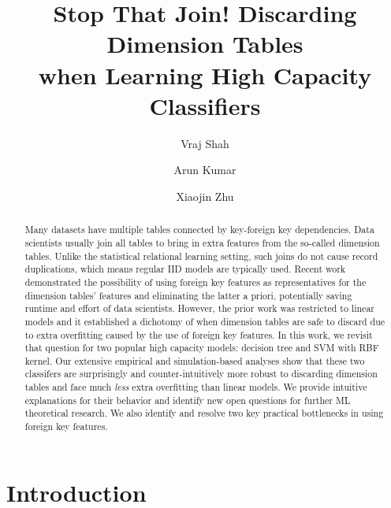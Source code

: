 

\title{Stop That Join! Discarding Dimension Tables \\when Learning High Capacity Classifiers}

\author{Vraj Shah}
\author{Arun Kumar}
\author{Xiaojin Zhu}

\begin{abstract}
Many datasets have multiple tables connected by key-foreign key dependencies.
Data scientists usually join all tables to bring in extra features from the so-called 
dimension tables. Unlike the statistical relational learning setting, such joins do 
not cause record duplications, which means regular IID models are typically used. Recent
work demonstrated the possibility of using foreign key features as representatives for the 
dimension tables' features and eliminating the latter a priori, potentially saving runtime
and effort of data scientists. However, the prior work was restricted to linear models 
and it established a dichotomy of when dimension tables are safe to discard due to extra
overfitting caused by the use of foreign key features. In this work, we revisit that question 
for two popular high capacity models: decision tree and SVM with RBF kernel. Our 
extensive empirical and simulation-based analyses show that these two classifers are surprisingly and 
counter-intuitively more robust to discarding dimension tables and face much \textit{less} extra overfitting 
than linear models. We provide intuitive explanations for their behavior and identify new open 
questions for further ML theoretical research. We also identify and resolve two key practical 
bottlenecks in using foreign key features.
\end{abstract}


\maketitle

\section{Introduction}

